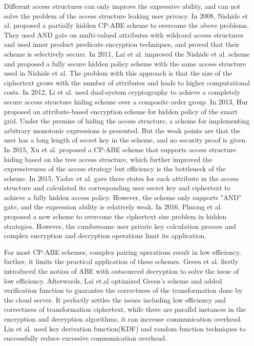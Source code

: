 \documentclass[smallextended]{svjour3}       %
\begin{document}
	Different access structures can only improve the expressive ability, and can not solve the problem of the access structure leaking user privacy.
	In 2008, Nishide et al. proposed a partially hidden CP-ABE scheme to overcome the above problems. 
	They used AND gate on multi-valued attributes with wildcard access structures and used inner product predicate encryption techniques, and proved that their scheme is selectively secure. 
	In 2011, Lai et al. improved the Nishide et al. scheme and proposed a fully secure hidden policy scheme with the same access structure used in Nishide et al. 
	The problem with this approach is that the size of the ciphertext grows with the number of attributes and leads to higher computational costs. 
	In 2012, Li et al. used dual-system cryptography to achieve a completely secure access structure hiding scheme over a composite order group. 
	In 2013, Hur proposed an attribute-based encryption scheme for hidden policy of the smart grid. 
	Under the premise of hiding the access structure, a scheme for implementing arbitrary monotonic expressions is presented. 
	But the weak points are that the user has a long length of secret key in the scheme, and no security proof is given. 
	In 2015, Xu et al. proposed a CP-ABE scheme that supports access structure hiding based on the tree access structure, which further improved the expressiveness of the access strategy but efficiency is the bottleneck of the scheme. 
	In 2015, Yadav et al. gave three states for each attribute in the access structure and calculated its corresponding user secret key and ciphertext to achieve a fully hidden access policy. 
	However, the scheme only supports "AND" gate, and the expression ability is relatively weak. 
	In 2016, Phuong et al. proposed a new scheme to overcome the ciphertext size problem in hidden strategies. 
	However, the cumbersome user private key calculation process and complex encryption and decryption operations limit its application.

	For most CP-ABE schemes, complex pairing operations result in low efficiency, further, it limits the practical application of these schemes.
	Green et al. firstly introduced the notion of ABE with outsourced decryption to solve the issue of low efficiency. 
	Afterwards, Lai et.al optimized Green's scheme and added verification function to guarantee the correctness of the transformation done by the cloud server.
	It perfectly settles the issues including low efficiency and correctness of transformation ciphertext, while there are parallel instances in the encryption and decryption algorithms, it can increase communication overhead.
	Lin et al. used key derivation function(KDF) and random function techniques to successfully reduce excessive communication overhead.
	
\end{document}
